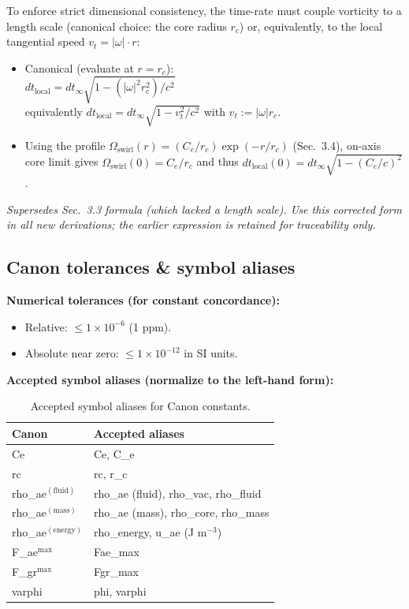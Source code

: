 \documentclass[11pt, a4paper]{article}
\begin{document}
To enforce strict dimensional consistency, the time-rate must couple vorticity to a length scale (canonical choice: the core radius $r_c$) or, equivalently, to the local tangential speed $v_t = |\omega| \cdot r$:

\begin{itemize}
    \item Canonical (evaluate at $r = r_c$):\\
    $dt_{\text{local}} = dt_{\infty} \sqrt{1 - (|\omega|^2 r_c^2)/c^2}$\\
    equivalently $dt_{\text{local}} = dt_{\infty} \sqrt{1 - v_t^2/c^2}$ with $v_t := |\omega| r_c$.
    \item Using the profile $\Omega_{\text{swirl}}(r) = (C_e/r_c) \exp(-r/r_c)$ (Sec.~3.4), on-axis core limit gives $\Omega_{\text{swirl}}(0) = C_e/r_c$ and thus $dt_{\text{local}}(0) = dt_{\infty} \sqrt{1 - (C_e/c)^2}$.
\end{itemize}

\textit{Supersedes Sec.~3.3 formula (which lacked a length scale). Use this corrected form in all new derivations; the earlier expression is retained for traceability only.}

\subsection*{ Canon tolerances \& symbol aliases}

\textbf{Numerical tolerances (for constant concordance):}
\begin{itemize}
    \item Relative: $\leq 1\times 10^{-6}$ (1 ppm).
    \item Absolute near zero: $\leq 1\times 10^{-12}$ in SI units.
\end{itemize}

\textbf{Accepted symbol aliases (normalize to the left-hand form):}

\begin{table}[h!]
\centering
\begin{tabular}{|l|l|}
\hline
\textbf{Canon} & \textbf{Accepted aliases} \\
\hline
Ce & Ce, C\_e \\
rc & rc, r\_c \\
rho\_ae$^{(\text{fluid})}$ & rho\_ae (fluid), rho\_vac, rho\_fluid \\
rho\_ae$^{(\text{mass})}$ & rho\_ae (mass), rho\_core, rho\_mass \\
rho\_ae$^{(\text{energy})}$ & rho\_energy, u\_ae (J m$^{-3}$) \\
F\_ae$^{\max}$ & Fae\_max \\
F\_gr$^{\max}$ & Fgr\_max \\
varphi & phi, varphi \\
\hline
\end{tabular}
\caption{Accepted symbol aliases for Canon constants.}
\end{table}
\end{document}
